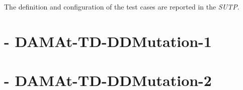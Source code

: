The definition and configuration of the test cases are reported in the \emph{SUTP}.

\section{\DAMA - DAMAt-TD-DDMutation-1}



\section{\DAMA - DAMAt-TD-DDMutation-2}



\clearpage
